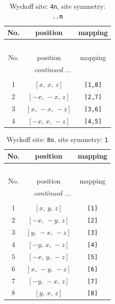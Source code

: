 \documentclass[fleqn,8pt]{jsarticle}
\begin{document}
\renewcommand{\arraystretch}{1.2}
\begin{longtable}{ccc}
\caption{Wyckoff site: {\tt 4n}, site symmetry: {\tt ..m}}
 \\
 \hline \hline
No. & position & mapping \\ \hline \endfirsthead

\multicolumn{2}{l}{\tablename\ \thetable{}} \\
 \hline \hline
No. & position & mapping \\ \hline \endhead

 \hline \hline
\multicolumn{2}{r}{\footnotesize\it continued ...} \\ \endfoot

 \hline \hline
\multicolumn{2}{r}{} \\ \endlastfoot

1 & $\left[ x,\, x,\, z \right]$ & {\tt [1,8]} \\ \hline
2 & $\left[ - x,\, - x,\, z \right]$ & {\tt [2,7]} \\ \hline
3 & $\left[ x,\, - x,\, - z \right]$ & {\tt [3,6]} \\ \hline
4 & $\left[ - x,\, x,\, - z \right]$ & {\tt [4,5]} \\
\end{longtable}
\renewcommand{\arraystretch}{1.2}
\begin{longtable}{ccc}
\caption{Wyckoff site: {\tt 8o}, site symmetry: {\tt 1}}
 \\
 \hline \hline
No. & position & mapping \\ \hline \endfirsthead

\multicolumn{2}{l}{\tablename\ \thetable{}} \\
 \hline \hline
No. & position & mapping \\ \hline \endhead

 \hline \hline
\multicolumn{2}{r}{\footnotesize\it continued ...} \\ \endfoot

 \hline \hline
\multicolumn{2}{r}{} \\ \endlastfoot

1 & $\left[ x,\, y,\, z \right]$ & {\tt [1]} \\ \hline
2 & $\left[ - x,\, - y,\, z \right]$ & {\tt [2]} \\ \hline
3 & $\left[ y,\, - x,\, - z \right]$ & {\tt [3]} \\ \hline
4 & $\left[ - y,\, x,\, - z \right]$ & {\tt [4]} \\ \hline
5 & $\left[ - x,\, y,\, - z \right]$ & {\tt [5]} \\ \hline
6 & $\left[ x,\, - y,\, - z \right]$ & {\tt [6]} \\ \hline
7 & $\left[ - y,\, - x,\, z \right]$ & {\tt [7]} \\ \hline
8 & $\left[ y,\, x,\, z \right]$ & {\tt [8]} \\
\end{longtable}
\end{document}
